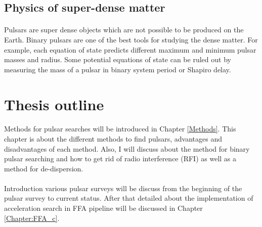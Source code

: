 \documentclass[thesis_msc.tex]{subfiles}
\begin{document}
  
   \subsection{Physics of super-dense matter}
    \paragraph{} Pulsars are super dense objects which are not possible to be produced on the Earth. Binary pulsars are one of the best tools for studying the dense matter. For example, each equation of state predicts different maximum and minimum pulsar masses and radius. %
    Some potential equations of state can be ruled out \citep{ozel2016masses} by measuring the mass of a pulsar in binary system period or Shapiro delay.  

\section{Thesis outline}
    \paragraph{} Methods for pulsar searches will be introduced in Chapter \ref{Methods}. This chapter is about the different methods to find pulsars, advantages and disadvantages of each method. Also, I will discuss about the method for binary pulsar searching and how to get rid of radio interference (RFI) as well as a method for de-dispersion.
    
    \paragraph{} Introduction various pulsar surveys will be discuss from the beginning of the pulsar survey to current status. After that detailed about the implementation of acceleration search in FFA pipeline will be discussed in Chapter \ref{Chapter:FFA_c}. 
    
\end{document}
